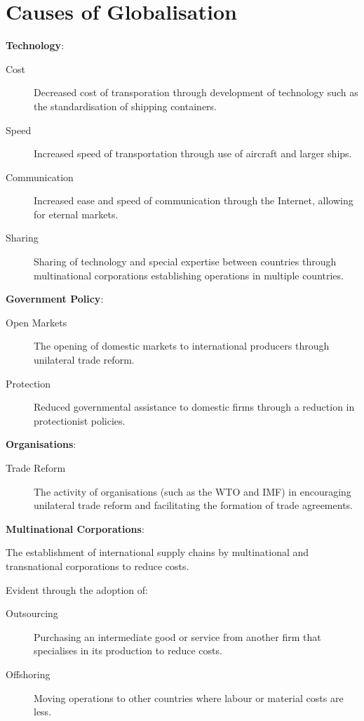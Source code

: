 \documentclass[a4paper,11pt]{report}
\begin{document}
\section{Causes of Globalisation}

\textbf{Technology}:

\begin{description}
\item [Cost] Decreased cost of transporation through development of technology
	such as the standardisation of shipping containers.
\item [Speed] Increased speed of transportation through use of aircraft and
	larger ships.
\item [Communication] Increased ease and speed of communication through the
	Internet, allowing for eternal markets.
\item [Sharing] Sharing of technology and special expertise between countries
	through multinational corporations establishing operations in multiple
	countries.
\end{description}

\textbf{Government Policy}:

\begin{description}
\item [Open Markets] The opening of domestic markets to international
	producers through unilateral trade reform.
\item [Protection] Reduced governmental assistance to domestic firms through a
	reduction in protectionist policies.
\end{description}

\textbf{Organisations}:

\begin{description}
\item [Trade Reform] The activity of organisations (such as the WTO and IMF) in
	encouraging unilateral trade reform and facilitating the formation of trade
	agreements.
\end{description}

\textbf{Multinational Corporations}:

The establishment of international supply chains by multinational and
transnational corporations to reduce costs.

Evident through the adoption of:

\begin{description}
\item [Outsourcing] Purchasing an intermediate good or service from another
	firm that specialises in its production to reduce costs.
\item [Offshoring] Moving operations to other countries where labour or
	material costs are less.
\end{description}
\end{document}

